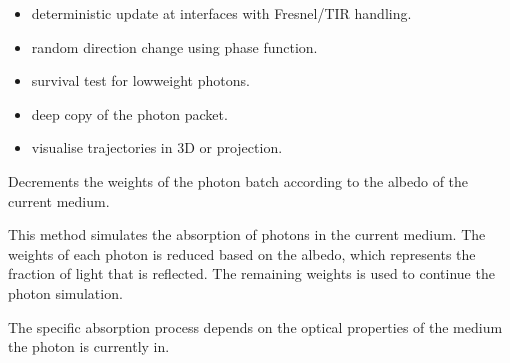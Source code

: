 \documentclass[letterpaper,10pt,english]{sphinxmanual}
\begin{document}
\begin{fulllineitems}
\begin{itemize}
\item {} 
\sphinxAtStartPar
{\hyperref[\detokenize{generated/photon_canon.optics:photon_canon.optics.Photon.reflect_refract}]{}} \textendash{} deterministic update at interfaces with Fresnel/TIR handling.

\item {} 
\sphinxAtStartPar
{\hyperref[\detokenize{generated/photon_canon.optics:photon_canon.optics.Photon.scatter}]{}} \textendash{} random direction change using phase function.

\item {} 
\sphinxAtStartPar
{\hyperref[\detokenize{generated/photon_canon.optics:photon_canon.optics.Photon.russian_roulette}]{}} \textendash{} survival test for low\sphinxhyphen{}weight photons.

\item {} 
\sphinxAtStartPar
{\hyperref[\detokenize{generated/photon_canon.optics:photon_canon.optics.Photon.copy}]{}} \textendash{} deep copy of the photon packet.

\item {} 
\sphinxAtStartPar
{\hyperref[\detokenize{generated/photon_canon.optics:photon_canon.optics.Photon.plot_path}]{}} \textendash{} visualise trajectories in 3\sphinxhyphen{}D or projection.

\end{itemize}

\begin{fulllineitems}
\label{\detokenize{generated/photon_canon.optics:photon_canon.optics.Photon.absorb}}
\pysigstartsignatures
\pysiglinewithargsret
{}
{}
{}
\pysigstopsignatures
\sphinxAtStartPar
Decrements the weights of the photon batch according to the albedo of the current medium.

\sphinxAtStartPar
This method simulates the absorption of photons in the current medium. The weights of each photon is
reduced based on the albedo, which represents the fraction of light that is reflected. The remaining
weights is used to continue the photon simulation.

\sphinxAtStartPar
The specific absorption process depends on the optical properties of the medium the photon is currently in.
\begin{quote}\begin{description}
\sphinxAtStartPar
{}


\end{description}
\end{quote}
\end{fulllineitems}
\end{fulllineitems}
\end{document}
